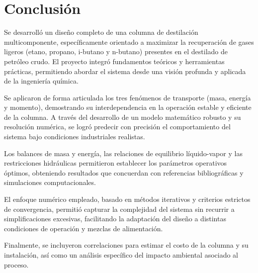 \section{Conclusión}

Se desarrolló un diseño completo de una columna de destilación multicomponente, específicamente orientado a maximizar la recuperación de gases ligeros (etano, propano, i-butano y n-butano) presentes en el destilado de petróleo crudo. El proyecto integró fundamentos teóricos y herramientas prácticas, permitiendo abordar el sistema desde una visión profunda y aplicada de la ingeniería química.

Se aplicaron de forma articulada los tres fenómenos de transporte (masa, energía y momento), demostrando su interdependencia en la operación estable y eficiente de la columna. A través del desarrollo de un modelo matemático robusto y su resolución numérica, se logró predecir con precisión el comportamiento del sistema bajo condiciones industriales realistas.

Los balances de masa y energía, las relaciones de equilibrio líquido-vapor y las restricciones hidráulicas permitieron establecer los parámetros operativos óptimos, obteniendo resultados que concuerdan con referencias bibliográficas y simulaciones computacionales.

El enfoque numérico empleado, basado en métodos iterativos y criterios estrictos de convergencia, permitió capturar la complejidad del sistema sin recurrir a simplificaciones excesivas, facilitando la adaptación del diseño a distintas condiciones de operación y mezclas de alimentación.

Finalmente, se incluyeron correlaciones para estimar el costo de la columna y su instalación, así como un análisis específico del impacto ambiental asociado al proceso.